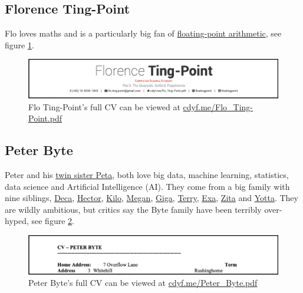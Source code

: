 \documentclass[
]{book}
\begin{document}
\hypertarget{flo-ting-point}{%
\subsection{Florence Ting-Point}\label{flo-ting-point}}

Flo loves maths and is a particularly big fan of \href{https://en.wikipedia.org/wiki/Floating-point_arithmetic}{floating-point arithmetic}, see figure \ref{fig:floatingpoint-fig}.

\begin{figure}

{\centering \includegraphics[width=1\linewidth]{images/flo_ting_point} 

}

\caption{Flo Ting-Point's full CV can be viewed at \href{https://www.cdyf.me/Flo_Ting-Point.pdf}{cdyf.me/Flo\_Ting-Point.pdf}}\label{fig:floatingpoint-fig}
\end{figure}



\hypertarget{peter-byte}{%
\subsection{Peter Byte}\label{peter-byte}}

Peter and his \href{https://en.wikipedia.org/wiki/Peta_(given_name)}{twin sister Peta}, both love big data, machine learning, statistics, data science and Artificial Intelligence (AI). They come from a big family with nine siblings, \href{https://en.wikipedia.org/wiki/Deca-}{Deca}, \href{https://en.wikipedia.org/wiki/Hecto-}{Hector}, \href{https://en.wikipedia.org/wiki/Kilo-}{Kilo}, \href{https://en.wikipedia.org/wiki/Mega-}{Megan}, \href{https://en.wikipedia.org/wiki/Giga-}{Giga}, \href{https://en.wikipedia.org/wiki/Tera-}{Terry}, \href{https://en.wikipedia.org/wiki/Exa-}{Exa}, \href{https://en.wikipedia.org/wiki/Zetta-}{Zita} and \href{https://en.wikipedia.org/wiki/Yotta-}{Yotta}. They are wildly ambitious, but critics say the Byte family have been terribly over-hyped, see figure \ref{fig:peterbyte-fig}.

\begin{figure}

{\centering \includegraphics[width=1\linewidth]{images/peter_byte} 

}

\caption{Peter Byte's full CV can be viewed at \href{https://www.cdyf.me/Peter_Byte.pdf}{cdyf.me/Peter\_Byte.pdf}}\label{fig:peterbyte-fig}
\end{figure}
\end{document}
